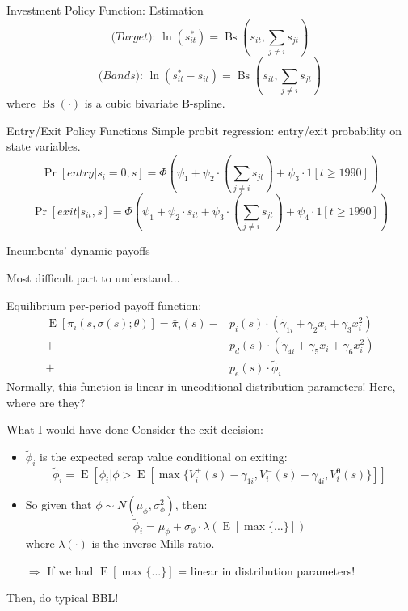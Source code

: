 \documentclass[12pt]{beamer}
\newcommand{\Prob}[1]{\operatorname{Pr}\left[#1\right]}
\newcommand{\E}[1]{\operatorname{E}\left[#1\right]}
\begin{document}
\begin{frame}{Investment Policy Function: Estimation}
$$\textit{(Target): } \ln(s_{it}^*) = \operatorname{Bs}\left(s_{it}, \sum_{j\neq i} s_{jt}\right) $$
$$\textit{(Bands): } \ln(s_{it}^* - s_{it}) = \operatorname{Bs}\left(s_{it}, \sum_{j\neq i} s_{jt}\right) $$
where $\operatorname{Bs}(\cdot)$ is a cubic bivariate B-spline.
\end{frame}

\begin{frame}{Entry/Exit Policy Functions}
Simple probit regression: entry/exit probability on state variables.
$$ \Prob{\textit{entry}|s_i =0, s} = \Phi\left(\psi_1 + \psi_2\cdot\left(\sum_{j\neq i} s_{jt}\right) + \psi_3\cdot 1[t \geq 1990]\right) $$
$$ \Prob{\textit{exit}|s_{it}, s} = \Phi\left(\psi_1 + \psi_2\cdot s_{it} + \psi_3\cdot\left(\sum_{j\neq i} s_{jt}\right) + \psi_4\cdot 1[t \geq 1990]\right) $$
\end{frame}

\begin{frame}{Incumbents' dynamic payoffs}
\begin{center}
Most difficult part to understand...
\end{center}
Equilibrium per-period payoff function:
\begin{align*}
\E{\pi_i(s, \sigma(s); \theta)} = \bar \pi_i(s) - & p_i(s) \cdot(\tilde \gamma_{1i} + \gamma_2 x_i + \gamma_3 x_i^2) \\ +  & p_d(s) \cdot(\tilde \gamma_{4i} + \gamma_5 x_i + \gamma_6 x_i^2) \\ + & p_e(s)\cdot \tilde{\phi}_i
\end{align*}
Normally, this function is linear in uncoditional distribution parameters! Here, where are they?
\end{frame}

\begin{frame}{What I would have done}
Consider the exit decision:
\begin{itemize}
\item $\tilde{\phi}_i$ is the expected scrap value conditional on exiting: $$\tilde{\phi}_i = \E{\phi_i | \phi > \E{\max\{V_i^+(s) - \gamma_{1i}, V_i^-(s) - \gamma_{4i}, V_i^0(s)\}}} $$
\item So given that $\phi \sim N(\mu_{\phi}, \sigma_{\phi}^2)$, then:  $$\tilde{\phi}_i = \mu_{\phi} + \sigma_{\phi} \cdot \lambda(\E{\max\{...\}}) $$
where $\lambda(\cdot)$ is the inverse Mills ratio.
\item[$\Rightarrow$] If we had $\E{\max\{...\}}$ = linear in distribution parameters!
\item[]
\end{itemize}
\begin{center}
Then, do typical BBL!
\end{center}
\end{frame}
\end{document}
